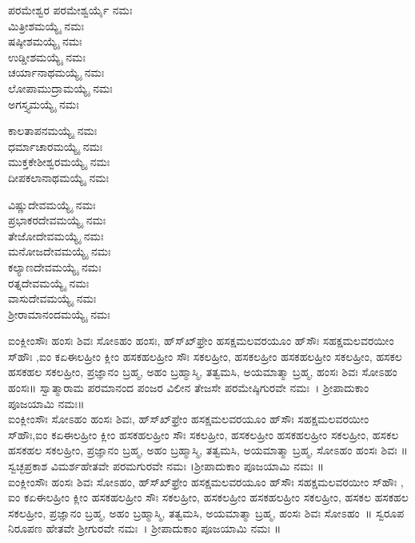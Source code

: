  ಪರಮೇಶ್ವರ ಪರಮೇಶ್ವರ್ಯೈ ನಮಃ\\
 ಮಿತ್ರೀಶಮಯ್ಯೈ ನಮಃ\\
 ಷಷ್ಠೀಶಮಯ್ಯೈ ನಮಃ\\
 ಉಡ್ಡೀಶಮಯ್ಯೈ ನಮಃ\\
 ಚರ್ಯಾನಾಥಮಯ್ಯೈ ನಮಃ\\
 ಲೋಪಾಮುದ್ರಾಮಯ್ಯೈ ನಮಃ\\
 ಅಗಸ್ತ್ಯಮಯ್ಯೈ ನಮಃ

 ಕಾಲತಾಪನಮಯ್ಯೈ ನಮಃ\\
 ಧರ್ಮಾಚಾರಮಯ್ಯೈ ನಮಃ\\
 ಮುಕ್ತಕೇಶೀಶ್ವರಮಯ್ಯೈ ನಮಃ\\
 ದೀಪಕಲಾನಾಥಮಯ್ಯೈ ನಮಃ

 ವಿಷ್ಣುದೇವಮಯ್ಯೈ ನಮಃ\\
 ಪ್ರಭಾಕರದೇವಮಯ್ಯೈ ನಮಃ\\
 ತೇಜೋದೇವಮಯ್ಯೈ ನಮಃ\\
 ಮನೋಜದೇವಮಯ್ಯೈ ನಮಃ\\
 ಕಲ್ಯಾಣದೇವಮಯ್ಯೈ ನಮಃ\\
 ರತ್ನದೇವಮಯ್ಯೈ ನಮಃ\\
 ವಾಸುದೇವಮಯ್ಯೈ ನಮಃ\\
 ಶ್ರೀರಾಮಾನಂದಮಯ್ಯೈ ನಮಃ

 ಐಂಕ್ಲೀಂಸೌಃ ಹಂಸಃ ಶಿವಃ ಸೋಽಹಂ ಹಂಸಃ, ಹ್‌ಸ್‌ಖ್‌ಫ್ರೇಂ ಹಸಕ್ಷಮಲವರಯೂಂ ಹ್‌ಸೌಃ ಸಹಕ್ಷಮಲವರಯೀಂ ಸ್‌ಹೌಃ ,ಐಂ ಕಏಈಲಹ್ರೀಂ ಕ್ಲೀಂ ಹಸಕಹಲಹ್ರೀಂ ಸೌಃ  ಸಕಲಹ್ರೀಂ, ಹಸಕಲಹ್ರೀಂ ಹಸಕಹಲಹ್ರೀಂ ಸಕಲಹ್ರೀಂ, ಹಸಕಲ ಹಸಕಹಲ ಸಕಲಹ್ರೀಂ, ಪ್ರಜ್ಞಾನಂ ಬ್ರಹ್ಮ, ಅಹಂ ಬ್ರಹ್ಮಾಸ್ಮಿ, ತತ್ವಮಸಿ, ಅಯಮಾತ್ಮಾ ಬ್ರಹ್ಮ, ಹಂಸಃ ಶಿವಃ ಸೋಽಹಂ ಹಂಸಃ॥ ಸ್ವಾತ್ಮಾರಾಮ ಪರಮಾನಂದ ಪಂಜರ ವಿಲೀನ ತೇಜಸೇ ಪರಮೇಷ್ಠಿಗುರವೇ ನಮಃ~। ಶ್ರೀಪಾದುಕಾಂ ಪೂಜಯಾಮಿ ನಮಃ॥\\
 ಐಂಕ್ಲೀಂಸೌಃ ಸೋಽಹಂ ಹಂಸಃ ಶಿವಃ, ಹ್‌ಸ್‌ಖ್‌ಫ್ರೇಂ ಹಸಕ್ಷಮಲವರಯೂಂ ಹ್‌ಸೌಃ ಸಹಕ್ಷಮಲವರಯೀಂ ಸ್‌ಹೌಃ,ಐಂ ಕಏಈಲಹ್ರೀಂ ಕ್ಲೀಂ ಹಸಕಹಲಹ್ರೀಂ ಸೌಃ  ಸಕಲಹ್ರೀಂ, ಹಸಕಲಹ್ರೀಂ ಹಸಕಹಲಹ್ರೀಂ ಸಕಲಹ್ರೀಂ, ಹಸಕಲ ಹಸಕಹಲ ಸಕಲಹ್ರೀಂ, ಪ್ರಜ್ಞಾನಂ ಬ್ರಹ್ಮ, ಅಹಂ ಬ್ರಹ್ಮಾಸ್ಮಿ, ತತ್ವಮಸಿ, ಅಯಮಾತ್ಮಾ ಬ್ರಹ್ಮ,  ಸೋಽಹಂ ಹಂಸಃ ಶಿವಃ ॥ ಸ್ವಚ್ಛಪ್ರಕಾಶ ವಿಮರ್ಶಹೇತವೇ ಪರಮಗುರವೇ ನಮಃ ।ಶ್ರೀಪಾದುಕಾಂ ಪೂಜಯಾಮಿ ನಮಃ ॥\\
 ಐಂಕ್ಲೀಂಸೌಃ ಹಂಸಃ ಶಿವಃ ಸೋಽಹಂ, ಹ್‌ಸ್‌ಖ್‌ಫ್ರೇಂ ಹಸಕ್ಷಮಲವರಯೂಂ ಹ್‌ಸೌಃ ಸಹಕ್ಷಮಲವರಯೀಂ ಸ್‌ಹೌಃ , ಐಂ ಕಏಈಲಹ್ರೀಂ ಕ್ಲೀಂ ಹಸಕಹಲಹ್ರೀಂ ಸೌಃ  ಸಕಲಹ್ರೀಂ, ಹಸಕಲಹ್ರೀಂ ಹಸಕಹಲಹ್ರೀಂ ಸಕಲಹ್ರೀಂ, ಹಸಕಲ ಹಸಕಹಲ ಸಕಲಹ್ರೀಂ, ಪ್ರಜ್ಞಾನಂ ಬ್ರಹ್ಮ, ಅಹಂ ಬ್ರಹ್ಮಾಸ್ಮಿ, ತತ್ವಮಸಿ, ಅಯಮಾತ್ಮಾ ಬ್ರಹ್ಮ, ಹಂಸಃ ಶಿವಃ ಸೋಽಹಂ~॥ ಸ್ವರೂಪ ನಿರೂಪಣ ಹೇತವೇ ಶ್ರೀಗುರವೇ ನಮಃ~। ಶ್ರೀಪಾದುಕಾಂ ಪೂಜಯಾಮಿ ನಮಃ ॥

 
